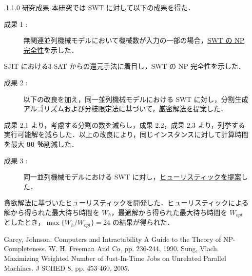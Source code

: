 \documentclass[oneside, 10pt, twocolumn]{jarticle}
\makeatletter
\def\section{\@startsection {section}{1}{\z@}{-3.5ex plus -1ex minus
-.2ex}{2.3 ex plus .2ex}{\large\bf}}
\renewcommand{\section}{
\@startsection{section}{1}{\z@}
{.1\Cvs \@plus.0\Cdp \@minus.1\Cdp}%
{.1\Cvs \@plus.1\Cdp \@minus.0\Cdp}%
{\reset@font\large\bfseries}}      %
\makeatother
\begin{document}
\section{研究成果}
本研究では SWT に対して以下の成果を得た．
\begin{description}
  \item[成果 1 : ]
  無関連並列機械モデルにおいて機械数が入力の一部の場合，\underline{SWT の NP 完全性}を示した．
\end{description}
SJIT における\textsc{3-SAT} からの還元手法に着目し，SWT の NP 完全性を示した．

\begin{description}
  \item[成果 2 : ]
  以下の改良を加え，同一並列機械モデルにおける SWT に対し，分割生成アルゴリズムおよび分枝限定法に基づいて，\underline{厳密解法を提案}した．
\end{description}
成果 2.1 より，考慮する分割の数を減らし，成果 2.2，成果 2.3 より，列挙する実行可能解を減らした．以上の改良により，同じインスタンスに対して計算時間を最大 {\bf 90 ％}削減した．

\begin{description}
  \item[成果 3 : ]
  同一並列機械モデルにおける SWT に対し，\underline{ヒューリスティックを提案}した．
\end{description}
貪欲解法に基づいたヒューリスティックを開発した．ヒューリスティックによる解から得られた最大待ち時間を $W_h$，最適解から得られた最大待ち時間を $W_{opt}$ としたとき，\mbox{\boldmath $\max\big\{W_h/W_{opt}\big\} = 24$} の結果が得られた．

\begin{thebibliography}{9} %
  Garey, Johnson.
  Computers and Intractability A Guide to the Theory of NP-Completeness.
  W. H. Freeman And Co, pp. 236-244, 1990.
  \vspace{-2mm}
  Sung, Vlach.
  Maximizing Weighted Number of Just-In-Time Jobs on Unrelated Parallel Machines. J SCHED 8, pp. 453-460, 2005.
\end{thebibliography}
\end{document}
